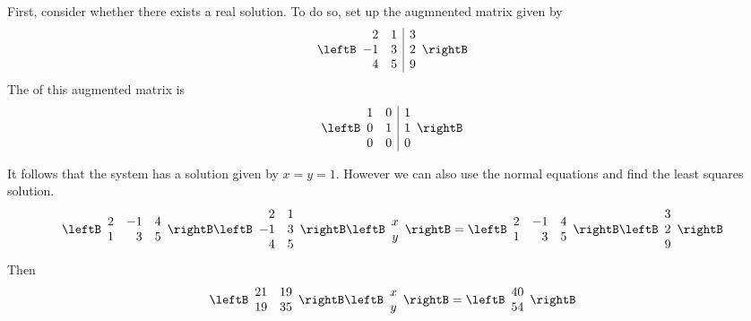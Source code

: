 \begin{solution}
First, consider whether there exists a real solution. To do so, set up the augmnented matrix given by
\begin{equation*}
\leftB
\begin{array}{rr|r}
2 & 1 & 3 \\ 
-1 & 3 & 2 \\ 
4 & 5 & 9
\end{array}
\rightB
\end{equation*}
The \rref\; of this augmented matrix is 
\begin{equation*}
\leftB
\begin{array}{rr|r}
1 & 0 & 1 \\ 
0 & 1 & 1 \\ 
0 & 0 & 0
\end{array}
\rightB
\end{equation*}

It follows that the system has a solution given by $x=y=1$. However we can also use the normal equations and find
the least squares solution. 
\begin{equation*}
\leftB 
\begin{array}{rrr}
2 & -1 & 4 \\ 
1 & 3 & 5
\end{array}
\rightB \leftB 
\begin{array}{rr}
2 & 1 \\ 
-1 & 3 \\ 
4 & 5
\end{array}
\rightB \leftB 
\begin{array}{c}
x \\ 
y
\end{array}
\rightB =\leftB 
\begin{array}{rrr}
2 & -1 & 4 \\ 
1 & 3 & 5
\end{array}
\rightB \leftB 
\begin{array}{r}
3 \\ 
2 \\ 
9
\end{array}
\rightB
\end{equation*}
Then
\begin{equation*}
\leftB 
\begin{array}{rr}
21 & 19 \\ 
19 & 35
\end{array}
\rightB \leftB 
\begin{array}{c}
x \\ 
y
\end{array}
\rightB =\leftB 
\begin{array}{c}
40 \\ 
54
\end{array}
\rightB
\end{equation*}


\end{solution}
